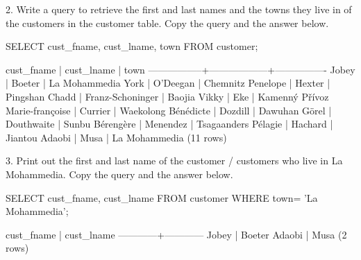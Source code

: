 2. Write a query to retrieve the first and last names and the towns they live in of the customers in the customer table. Copy the query and the answer below.
\begin{sql}
SELECT cust_fname, cust_lname, town FROM customer;
\end{sql}
\begin{pseudo*}
   cust_fname    |    cust_lname    |      town
-----------------+------------------+----------------
 Jobey           | Boeter           | La Mohammedia
 York            | O'Deegan         | Chemnitz
 Penelope        | Hexter           | Pingshan
 Chadd           | Franz-Schoninger | Baojia
 Vikky           | Eke              | Kamenný Přívoz
 Marie-françoise | Currier          | Waekolong
 Bénédicte       | Dozdill          | Dawuhan
 Görel           | Douthwaite       | Sunbu
 Bérengère       | Menendez         | Tsagaanders
 Pélagie         | Hachard          | Jiantou
 Adaobi          | Musa             | La Mohammedia
(11 rows)
\end{pseudo*}

3. Print out the first and last name of the customer / customers who live in La Mohammedia. Copy the query and the answer below.
\begin{sql}
SELECT cust_fname, cust_lname FROM customer WHERE town= 'La Mohammedia';
\end{sql}
\begin{pseudo*}
 cust_fname | cust_lname 
------------+------------
 Jobey      | Boeter
 Adaobi     | Musa
(2 rows)
\end{pseudo*}

